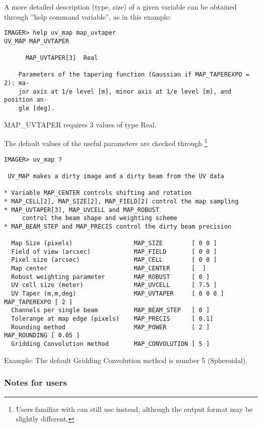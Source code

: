 A more detailed description (type, size) of a given variable can be obtained 
through ''help command variable'', as in this example:
\begin{verbatim} 
IMAGER> help uv_map map_uvtaper
UV_MAP MAP_UVTAPER
 
      MAP_UVTAPER[3]  Real
 
    Parameters of the tapering function (Gaussian if MAP_TAPEREXPO = 2): ma-
    jor axis at 1/e level [m], minor axis at 1/e level [m], and position an-
    gle [deg].
\end{verbatim} 
MAP\_UVTAPER requires 3 values of type Real.
\vspace{0.5cm}

The default values of the useful parameters are checked through 
\footnote{Users familiar with \mapping{} can still use 
 instead, although the output format may be slightly 
different.}
\begin{verbatim} 
IMAGER> uv_map ?
 
 UV_MAP makes a dirty image and a dirty beam from the UV data
 
* Variable MAP_CENTER controls shifting and rotation
* MAP_CELL[2], MAP_SIZE[2], MAP_FIELD[2] control the map sampling
* MAP_UVTAPER[3], MAP_UVCELL and MAP_ROBUST
     control the beam shape and weighting scheme
* MAP_BEAM_STEP and MAP_PRECIS control the dirty beam precision
 
  Map Size (pixels)                 MAP_SIZE        [ 0 0 ]
  Field of view (arcsec)            MAP_FIELD       [ 0 0 ]
  Pixel size (arcsec)               MAP_CELL        [ 0 0 ] 
  Map center                        MAP_CENTER      [  ]      
  Robust weighting parameter        MAP_ROBUST      [ 0 ]
  UV cell size (meter)              MAP_UVCELL      [ 7.5 ]   
  UV Taper (m,m,deg)                MAP_UVTAPER     [ 0 0 0 ] MAP_TAPEREXPO [ 2 ]
  Channels per single beam          MAP_BEAM_STEP   [ 0 ]
  Tolerange at map edge (pixels)    MAP_PRECIS      [ 0.1]
  Rounding method                   MAP_POWER       [ 2 ]     MAP_ROUNDING [ 0.05 ]
  Gridding Convolution method       MAP_CONVOLUTION [ 5 ]
\end{verbatim} 
Example: The default Gridding Convolution method is number 5 (Spheroidal).

\subsubsection{Notes for \mapping{} users}

